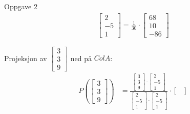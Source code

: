 \documentclass[11pt, a4paper, norsk]{article}
\begin{document}
\begin{Example}{Oppgave 2}{}
\begin{align*}
\begin{bmatrix}
                                        2 \\
                                        -5 \\
                                        1
                                    \end{bmatrix} = \frac{1}{30} \cdot \begin{bmatrix}
                                        68 \\
                                        10 \\
                                        -86
                                    \end{bmatrix}
                \end{align*}

                Projeksjon av $\begin{bmatrix}
                    3 \\
                    3 \\
                    9
                \end{bmatrix}$ ned på $ColA$:
                \begin{align*}
                    P\left(\begin{bmatrix}
                        3 \\
                        3 \\
                        9
                \end{bmatrix}\right) &= \frac{\begin{bmatrix}
                    3 \\
                    3 \\
                    9
                \end{bmatrix} \cdot \begin{bmatrix}
                    2 \\
                    -5 \\
                    1
                \end{bmatrix}}{\begin{bmatrix}
                    2 \\
                    -5 \\
                    1
                \end{bmatrix} \cdot \begin{bmatrix}
                    2 \\
                    -5 \\
                    1
                \end{bmatrix}} \cdot \begin{bmatrix}

\end{bmatrix}
\end{align*}
\end{Example}
\end{document}
